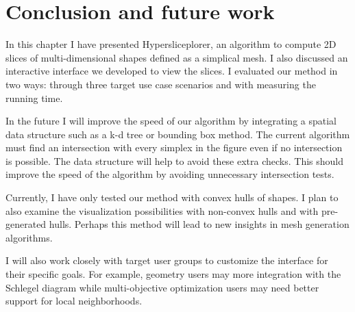 \section{Conclusion and future work}

In this chapter I have presented Hypersliceplorer, an algorithm to compute
2D slices of multi-dimensional shapes defined as a simplical mesh. 
I also discussed an interactive interface we developed to view the slices.
I evaluated our method in two ways: through three target use case scenarios
and with measuring the running time.

In the future I will improve the speed of our algorithm by integrating a
spatial data structure such as a k-d tree or bounding box method. The current
algorithm must find an intersection with every simplex in the figure even if
no intersection is possible.
The data structure will help to avoid these extra checks. This should
improve the speed of the algorithm by avoiding unnecessary intersection tests.

Currently, I have only tested our method with convex hulls of shapes. I
plan to also examine the visualization possibilities with non-convex hulls
and with pre-generated hulls. Perhaps this method will lead to new insights
in mesh generation algorithms.

I will also work closely with target user groups to customize the interface
for their specific goals. For example, geometry users may more integration with
the Schlegel diagram while multi-objective optimization users may need better
support for local neighborhoods.


